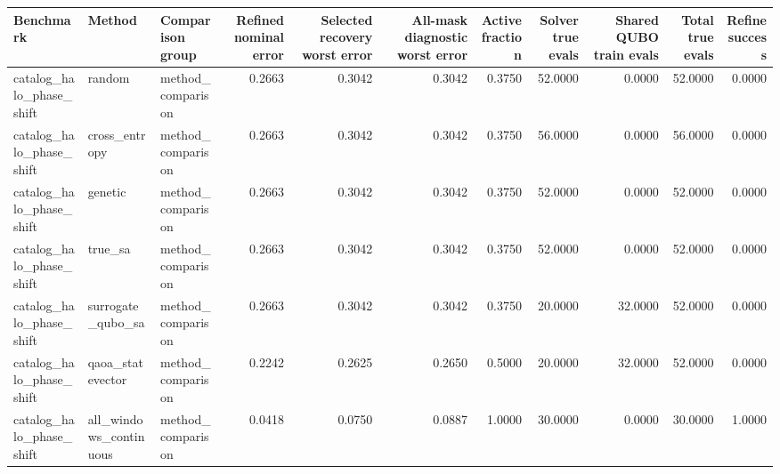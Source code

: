 \begin{tabular}{lllrrrrrrrr}
\toprule
Benchmark & Method & Comparison group & Refined nominal error & Selected recovery worst error & All-mask diagnostic worst error & Active fraction & Solver true evals & Shared QUBO train evals & Total true evals & Refine success \\
\midrule
catalog\_halo\_phase\_shift & random & method\_comparison & 0.2663 & 0.3042 & 0.3042 & 0.3750 & 52.0000 & 0.0000 & 52.0000 & 0.0000 \\
catalog\_halo\_phase\_shift & cross\_entropy & method\_comparison & 0.2663 & 0.3042 & 0.3042 & 0.3750 & 56.0000 & 0.0000 & 56.0000 & 0.0000 \\
catalog\_halo\_phase\_shift & genetic & method\_comparison & 0.2663 & 0.3042 & 0.3042 & 0.3750 & 52.0000 & 0.0000 & 52.0000 & 0.0000 \\
catalog\_halo\_phase\_shift & true\_sa & method\_comparison & 0.2663 & 0.3042 & 0.3042 & 0.3750 & 52.0000 & 0.0000 & 52.0000 & 0.0000 \\
catalog\_halo\_phase\_shift & surrogate\_qubo\_sa & method\_comparison & 0.2663 & 0.3042 & 0.3042 & 0.3750 & 20.0000 & 32.0000 & 52.0000 & 0.0000 \\
catalog\_halo\_phase\_shift & qaoa\_statevector & method\_comparison & 0.2242 & 0.2625 & 0.2650 & 0.5000 & 20.0000 & 32.0000 & 52.0000 & 0.0000 \\
catalog\_halo\_phase\_shift & all\_windows\_continuous & method\_comparison & 0.0418 & 0.0750 & 0.0887 & 1.0000 & 30.0000 & 0.0000 & 30.0000 & 1.0000 \\
\bottomrule
\end{tabular}
